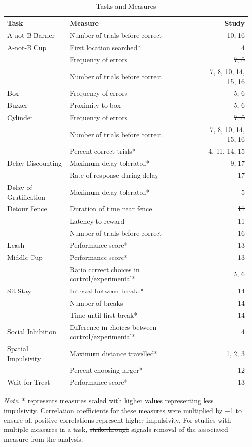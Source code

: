 \documentclass[
  ,pub,floatsintext]{apa6}
\begin{document}
\begin{table}

\caption{\label{tab:tasks}Tasks and Measures}
\centering
\begin{threeparttable}
\begin{tabular}[t]{l>{\raggedright\arraybackslash}p{5.5cm}r}
\toprule
Task & Measure & Study\\
\midrule
A-not-B Barrier & Number of trials before correct & 10, 16\\
A-not-B Cup & First location searched* & 4\\
 & Frequency of errors & \sout{7, 8}\\
 & Number of trials before correct & 7, 8, 10, 14, 15, \vphantom{1} 16\\
Box & Frequency of errors & 5, 6\\
Buzzer & Proximity to box & 5, 6\\
Cylinder & Frequency of errors & \sout{7, 8}\\
 & Number of trials before correct & 7, 8, 10, 14, 15, 16\\
 & Percent correct trials* & 4, 11, \sout{14, 15}\\
Delay Discounting & Maximum delay tolerated* & 9, 17\\
 & Rate of response during delay & \sout{17}\\
Delay of Gratification & Maximum delay tolerated* & 5\\
Detour Fence & Duration of time near fence & \sout{11}\\
 & Latency to reward & 11\\
 & Number of trials before correct & 16\\
Leash & Performance score* & 13\\
Middle Cup & Performance score* & 13\\
 & Ratio correct choices in control/experimental* & 5, 6\\
Sit-Stay & Interval between breaks* & \sout{14}\\
 & Number of breaks & 14\\
 & Time until first break* & \sout{14}\\
Social Inhibition & Difference in choices between control/experimental* & 4\\
Spatial Impulsivity & Maximum distance travelled* & 1, 2, 3\\
 & Percent choosing larger* & 12\\
Wait-for-Treat & Performance score* & 13\\
\bottomrule
\end{tabular}
\begin{tablenotes}
\item \linebreak \textit{Note}. * represents measures scaled with higher values representing less impulsivity. Correlation coefficients for these measures were multiplied by $-$1 to ensure all positive correlations represent higher impulsivity. For studies with multiple measures in a task, \sout{strikethrough} signals removal of the associated measure from the analysis.
\end{tablenotes}
\end{threeparttable}
\end{table}
\end{document}
